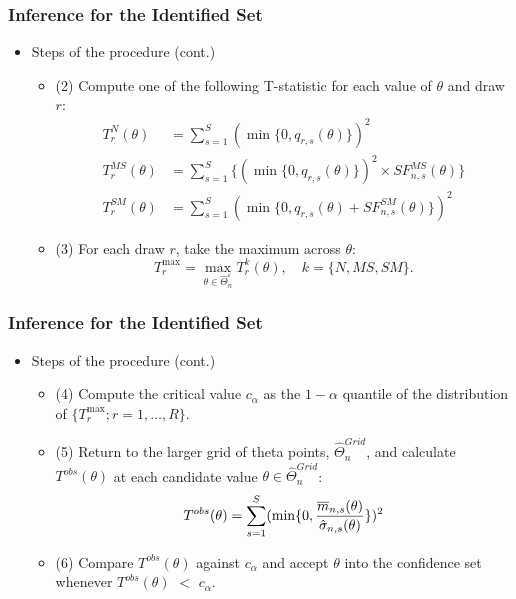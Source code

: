 \documentclass[notes=show]{beamer}
\begin{document}

\begin{frame}
\frametitle{Inference for the Identified Set}

\begin{itemize}
\item Steps of the procedure (cont.) 

\begin{itemize}
\item (2) Compute one of the following T-statistic for each value of $\theta 
$ and draw $r$: 
\begin{equation*}
\begin{split}
T_{r}^{N}(\theta )& =\sum_{s=1}^{S}(\min \{0,q_{r,s}(\theta )\})^{2} \\
T_{r}^{MS}(\theta )& =\sum_{s=1}^{S}\{(\min \{0,q_{r,s}(\theta
)\})^{2}\times SF_{n,s}^{MS}(\theta )\} \\
T_{r}^{SM}(\theta )& =\sum_{s=1}^{S}(\min \{0,q_{r,s}(\theta
)+SF_{n,s}^{SM}(\theta )\})^{2}
\end{split}%
\end{equation*}

\item (3) For each draw $r$, take the maximum across $\theta $: 
\begin{equation*}
T_{r}^{\max }=\max_{\theta \in \widehat{\Theta }_{n}^{\varepsilon
}}T_{r}^{k}(\theta ),\quad k=\{N,MS,SM\}.
\end{equation*}
\end{itemize}
\end{itemize}
\end{frame}


\begin{frame}
\frametitle{Inference for the Identified Set}

\begin{itemize}
\item Steps of the procedure (cont.) 

\begin{itemize}
\item (4) Compute the critical value $c_{\alpha}$ as the $1-\alpha$ quantile
of the distribution of $\{T^{\max}_{r}; r=1,\dots,R\}$. 

\item (5) Return to the larger grid of theta points, $\widehat{\Theta }%
_{n}^{Grid}$, and calculate $T^{obs}(\theta )$ at each candidate value $%
\theta \in \widehat{\Theta }_{n}^{Grid}$: 
\begin{equation*}
T^{obs}(\theta )=\sum_{s=1}^{S}(\min \{0,\frac{\overline{m}_{n,s}(\theta )}{%
\hat{\sigma}_{n,s}(\theta )}\})^{2}
\end{equation*}

\item (6) Compare $T^{obs}(\theta)$ against $c_{\alpha}$ and accept $\theta$
into the confidence set whenever $T^{obs}(\theta)$ $<$ $c_{\alpha}$. 
\end{itemize}
\end{itemize}
\end{frame}
\end{document}
